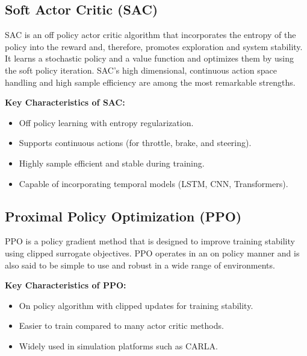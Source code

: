 \documentclass[a4paper,final,12pt]{report}
\begin{document}
\subsection{Soft Actor Critic (SAC)}
SAC is an off policy actor critic algorithm that incorporates the entropy of the policy into the reward and, therefore, promotes exploration and system stability. It learns a stochastic policy and a value function and optimizes them by using the soft policy iteration. SAC's high dimensional, continuous action space handling and high sample efficiency are among the most remarkable strengths.

\vspace{0.2cm}
\noindent \textbf{Key Characteristics of SAC:}
\begin{itemize}
    \item Off policy learning with entropy regularization.
    \item Supports continuous actions (for throttle, brake, and steering).
    \item Highly sample efficient and stable during training.
    \item Capable of incorporating temporal models (LSTM, CNN, Transformers).
\end{itemize}

\subsection{Proximal Policy Optimization (PPO)}
PPO is a policy gradient method that is designed to improve training stability using clipped surrogate objectives. PPO operates in an on policy manner and is also said to be simple to use and robust in a wide range of environments.

\vspace{0.2cm}
\noindent \textbf{Key Characteristics of PPO:}
\begin{itemize}
    \item On policy algorithm with clipped updates for training stability.
    \item Easier to train compared to many actor critic methods.
    \item Widely used in simulation platforms such as CARLA.
\end{itemize}
\end{document}
